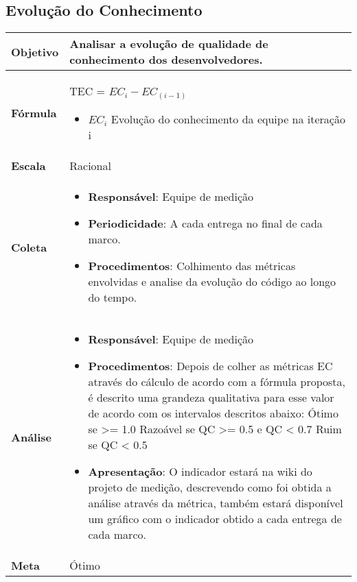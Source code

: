 \subsection{Evolução do Conhecimento}

	\begin{tabular}{ |p{3cm}|p{12cm}| }      
	 \hline
    \textbf{Objetivo} & Analisar a evolução de qualidade de conhecimento dos desenvolvedores. \\
   \hline
    \textbf{Fórmula} & TEC = $EC_i - EC_(i-1)$ \begin{itemize}
			\item $EC_i$ Evolução do conhecimento da equipe na iteração i
		\end{itemize}\\
   \hline
    \textbf{Escala} & Racional \\
   \hline
    \textbf{Coleta} & \begin{itemize}
		 \item \textbf{Responsável}: Equipe de medição
     \item \textbf{Periodicidade}: A cada entrega no final de cada marco.
     \item \textbf{Procedimentos}: Colhimento das métricas envolvidas e analise da evolução do código ao longo do tempo.
    \end{itemize} \\
   \hline
    \textbf{Análise} & \begin{itemize} \item \textbf{Responsável}: Equipe de medição
    \item \textbf{Procedimentos}: Depois de colher as métricas EC através do cálculo de acordo com a fórmula proposta, é descrito uma grandeza qualitativa para esse valor de acordo com os intervalos descritos abaixo:
		 \subitem Ótimo se  >= 1.0
		 \subitem Razoável se QC >= 0.5 e QC < 0.7
		 \subitem Ruim se QC < 0.5
	\item \textbf{Apresentação}: O indicador estará na wiki do projeto de medição, descrevendo como foi obtida a análise através da métrica, também estará disponível um gráfico com o indicador obtido a cada entrega de cada marco.
	\end{itemize} \\
  \hline
	 \textbf{Meta} & Ótimo \\
	\hline

\end{tabular}
